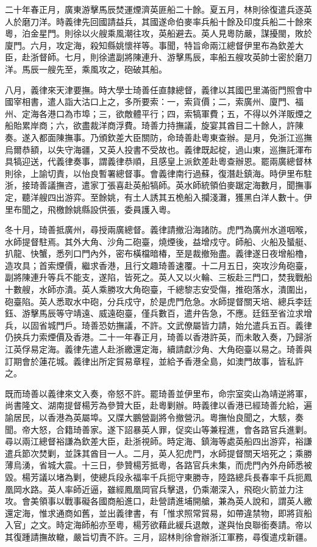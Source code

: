 \begin{pinyinscope}
二十年春正月，廣東游擊馬辰焚運煙濟英匪船二十餘。夏五月，林則徐復遣兵逐英人於磨刀洋。時義律先回國請益兵，其國遂命伯麥率兵船十餘及印度兵船二十餘來粵，泊金星門。則徐以火艘乘風潮往攻，英船避去。英人見粵防嚴，謀擾閩，敗於廈門。六月，攻定海，殺知縣姚懷祥等。事聞，特旨命兩江總督伊里布為欽差大臣，赴浙督師。七月，則徐遣副將陳連升、游擊馬辰，率船五艘攻英帥士密於磨刀洋。馬辰一艘先至，乘風攻之，砲破其船。

八月，義律來天津要撫。時大學士琦善任直隸總督，義律以其國巴里滿衙門照會中國宰相書，遣人詣大沽口上之，多所要索：一，索貨價；二，索廣州、廈門、福州、定海各港口為市埠；三，欲敵體平行；四，索犒軍費；五，不得以外洋販煙之船貽累岸商；六，欲盡裁洋商浮費。琦善力持撫議，旋宴其酋目二十餘人，許陳奏。遂入都面陳撫事。乃頒欽差大臣關防，命琦善赴粵東查辦。是月，免浙江巡撫烏爾恭額，以失守海疆，又英人投書不受故也。義律既起椗，過山東，巡撫託渾布具犒迎送，代義律奏事，謂義律恭順，且感皇上派欽差赴粵查辦恩。罷兩廣總督林則徐，上諭切責，以怡良暫署總督事。會義律南行過蘇，復潛赴鎮海。時伊里布駐浙，接琦善議撫咨，遣家丁張喜赴英船犒師。英水師統領伯麥踞定海數月，聞撫事定，聽洋艘四出游弈。至餘姚，有土人誘其五桅船入攔淺灘，獲黑白洋人數十。伊里布聞之，飛檄餘姚縣設供張，委員護入粵。

冬十月，琦善抵廣州，尋授兩廣總督。義律請撤沿海諸防。虎門為廣州水道咽喉，水師提督駐焉。其外大角、沙角二砲臺，燒煙後，益增戍守。師船、火船及蜑艇、扒龍、快蟹，悉列口門內外，密布橫檔暗椿，至是裁撤殆盡。義律遂日夜增船櫓，造攻具；首索煙價，繼求香港，且行文趣琦善速覆。十二月五日，突攻沙角砲臺，副將陳連升等兵不能支，遂陷，皆死之。英人又以火輪、三板赴三門口，焚我戰船十數艘，水師亦潰。英人乘勝攻大角砲臺，千總黎志安受傷，推砲落水，潰圍出，砲臺陷。英人悉取水中砲，分兵戍守，於是虎門危急。水師提督關天培、總兵李廷鈺、游擊馬辰等守靖遠、威遠砲臺，僅兵數百，遣弁告急，不應。廷鈺至省泣求增兵，以固省城門戶。琦善恐妨撫議，不許。文武僚屬皆力請，始允遣兵五百。義律仍挾兵力索煙價及香港。二十一年春正月，琦善以香港許英，而未敢入奏，乃歸浙江英俘易定海。義律先遣人赴浙繳還定海，續請獻沙角、大角砲臺以易之。琦善與訂期會於蓮花城。義律出所定貿易章程，並給予香港全島，如澳門故事，皆私許之。

既而琦善以義律來文入奏，帝怒不許。罷琦善並伊里布，命宗室奕山為靖逆將軍，尚書隆文、湖南提督楊芳為參贊大臣，赴粵剿辦。時義律以香港已經琦善允給，遍諭居民，以香港為英屬埠。又牒大鵬營副將令撤營汛。粵撫怡良聞之，大駭，奏聞。帝大怒，合籍琦善家。遂下詔暴英人罪，促奕山等兼程進，會各路官兵進剿。尋以兩江總督裕謙為欽差大臣，赴浙視師。時定海、鎮海等處英船四出游弈，裕謙遣兵節次焚剿，並誅其酋目一人。二月，英人犯虎門，水師提督關天培死之；乘勝薄烏湧，省城大震。十三日，參贊楊芳抵粵，各路官兵未集，而虎門內外舟師悉被毀。楊芳議以堵為剿，使總兵段永福率千兵扼守東勝寺，陸路總兵長春率千兵扼鳳凰岡水路。英人率師近逼，雖經鳳凰岡官兵擊退，仍乘潮深入，飛砲火箭並力注攻。會美領事以戰事礙各國商船進口，赴營請進埔開艙，兼為英人說和，謂英人繳還定海，惟求通商如舊，並出義律書，有「惟求照常貿易，如帶違禁物，即將貨船入官」之文。時定海師船亦至粵，楊芳欲藉此緩兵退敵，遂與怡良聯銜奏請。帝以其復踵請撫故轍，嚴旨切責不許。三月，詔林則徐會辦浙江軍務，尋復遣戍新疆。


\end{pinyinscope}
